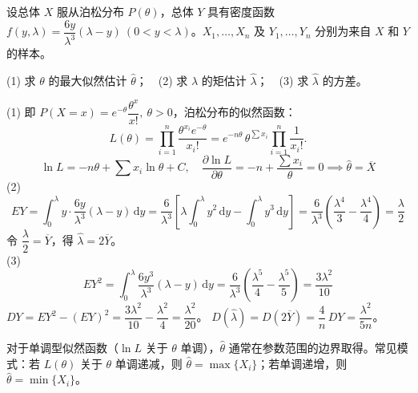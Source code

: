 \documentclass[lang=cn,11pt]{elegantbook}
\begin{document}
\begin{exercise}\label{exer:7-poisson-tri}
设总体 \(X\) 服从泊松分布 \(P(\theta)\)，总体 \(Y\) 具有密度函数 \(f(y,\lambda) = \dfrac{6y}{\lambda^3}(\lambda-y)\ (0 < y < \lambda)\)。\(X_1, \dots, X_n\) 及 \(Y_1, \dots, Y_n\) 分别为来自 \(X\) 和 \(Y\) 的样本。\par
(1) 求 \(\theta\) 的最大似然估计 \(\hat{\theta}\)；~~(2) 求 \(\lambda\) 的矩估计 \(\hat{\lambda}\)；~~(3) 求 \(\hat{\lambda}\) 的方差。
\end{exercise}
\begin{solution}
(1) 即 \(P(X=x) = e^{-\theta}\dfrac{\theta^x }{x!},\ \theta > 0\)，泊松分布的似然函数：
\[
L(\theta) = \prod_{i=1}^{n}\frac{\theta^{x_i}e^{-\theta}}{x_i!} = e^{-n\theta}\,\theta^{\sum x_i}\prod_{i=1}^{n}\frac{1}{x_i!}.
\]
\[
\ln L = -n\theta + \sum x_i\ln\theta + C,\quad \frac{\partial\ln L}{\partial\theta} = -n + \frac{\sum x_i}{\theta} = 0\implies \hat{\theta} = \overline{X}
\]
(2) \[EY = \displaystyle\int_0^\lambda y\cdot\frac{6y}{\lambda^3}(\lambda-y)\,\mathrm{d}y = \frac{6}{\lambda^3}\!\left[\lambda\int_0^\lambda y^2\,\mathrm{d}y - \int_0^\lambda y^3\,\mathrm{d}y\right] = \frac{6}{\lambda^3}\!\left(\frac{\lambda^4}{3}-\frac{\lambda^4}{4}\right) = \frac{\lambda}{2}\]
令 \(\dfrac{\lambda}{2} = \overline{Y}\)，得 \(\hat{\lambda} = 2\overline{Y}\)。\\
(3) \[EY^2 = \displaystyle\int_0^\lambda \frac{6y^3}{\lambda^3}(\lambda-y)\,\mathrm{d}y = \frac{6}{\lambda^3}\!\left(\frac{\lambda^5}{4}-\frac{\lambda^5}{5}\right) = \frac{3\lambda^2}{10}\]
\(DY = EY^2 - (EY)^2 = \dfrac{3\lambda^2}{10} - \dfrac{\lambda^2}{4} = \dfrac{\lambda^2}{20}\)。
\(D(\hat{\lambda}) = D(2\overline{Y}) = \dfrac{4}{n}\,DY = \dfrac{\lambda^2}{5n}\)。
\end{solution}

\begin{note}
对于单调型似然函数（\(\ln L\) 关于 \(\theta\) 单调），\(\hat{\theta}\) 通常在参数范围的边界取得。常见模式：若 \(L(\theta)\) 关于 \(\theta\) 单调递减，则 \(\hat{\theta} = \max\{X_i\}\)；若单调递增，则 \(\hat{\theta} = \min\{X_i\}\)。
\end{note}
\end{document}
